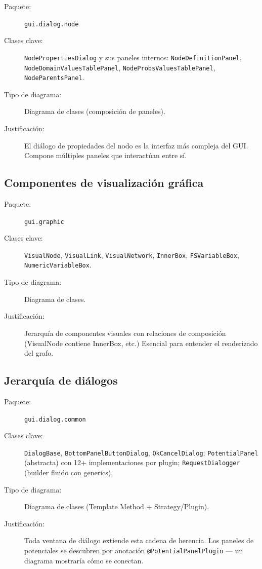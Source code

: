 \documentclass[11pt,a4paper]{article}
\newcommand{\code}[1]{\texttt{#1}}
\newcommand{\pkg}[1]{\texttt{\small #1}}
\begin{document}
\begin{description}
  \item[Paquete:] \pkg{gui.dialog.node}
  \item[Clases clave:] \code{NodePropertiesDialog} y sus paneles
        internos: \code{NodeDefinitionPanel},
        \code{NodeDomainValuesTablePanel},
        \code{NodeProbsValuesTablePanel}, \code{NodeParentsPanel}.
  \item[Tipo de diagrama:] Diagrama de clases (composici\'on de paneles).
  \item[Justificaci\'on:] El di\'alogo de propiedades del nodo es la
        interfaz m\'as compleja del GUI.  Compone m\'ultiples paneles
        que interact\'uan entre s\'i.
\end{description}

\subsection{Componentes de visualizaci\'on gr\'afica}

\begin{description}
  \item[Paquete:] \pkg{gui.graphic}
  \item[Clases clave:] \code{VisualNode}, \code{VisualLink},
        \code{VisualNetwork}, \code{InnerBox}, \code{FSVariableBox},
        \code{NumericVariableBox}.
  \item[Tipo de diagrama:] Diagrama de clases.
  \item[Justificaci\'on:] Jerarqu\'ia de componentes visuales con
        relaciones de composici\'on (VisualNode contiene InnerBox, etc.)
        Esencial para entender el renderizado del grafo.
\end{description}

\subsection{Jerarqu\'ia de di\'alogos}

\begin{description}
  \item[Paquete:] \pkg{gui.dialog.common}
  \item[Clases clave:] \code{DialogBase}, \code{BottomPanelButtonDialog},
        \code{OkCancelDialog}; \code{PotentialPanel} (abstracta) con 12+
        implementaciones por plugin; \code{RequestDialogger} (builder
        fluido con generics).
  \item[Tipo de diagrama:] Diagrama de clases (Template Method +
        Strategy/Plugin).
  \item[Justificaci\'on:] Toda ventana de di\'alogo extiende esta
        cadena de herencia.  Los paneles de potenciales se descubren
        por anotaci\'on \code{@PotentialPanelPlugin} --- un diagrama
        mostrar\'ia c\'omo se conectan.
\end{description}
\end{document}
